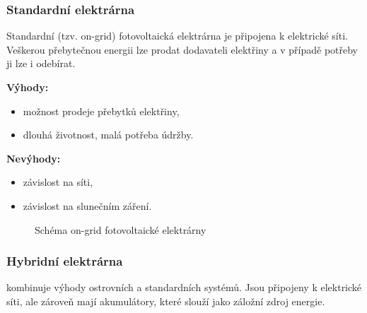 \subsubsection{Standardní elektrárna}

Standardní (tzv. on-grid) fotovoltaická elektrárna je připojena k elektrické síti.
Veškerou přebytečnou energii lze prodat dodavateli elektřiny a v případě potřeby ji lze i odebírat.

\begin{multicols}{2}
    \textbf{Výhody:}
    \begin{itemize}[leftmargin=*]
        \item možnost prodeje přebytků elektřiny,
        \item dlouhá životnost, malá potřeba údržby.
    \end{itemize}
    
    \columnbreak
    
    \textbf{Nevýhody:}
    \begin{itemize}[leftmargin=*]
        \item závislost na síti,
        \item závislost na slunečním záření.
    \end{itemize}
\end{multicols}


\begin{figure}[H]
    \centering
    \caption{Schéma on-grid fotovoltaické elektrárny}
    \label{fig:ongrid_schema}
    \end{figure}


\subsubsection{Hybridní elektrárna}

kombinuje výhody ostrovních a standardních systémů.
Jsou připojeny k elektrické síti, ale zároveň mají akumulátory, které slouží jako záložní zdroj energie.

